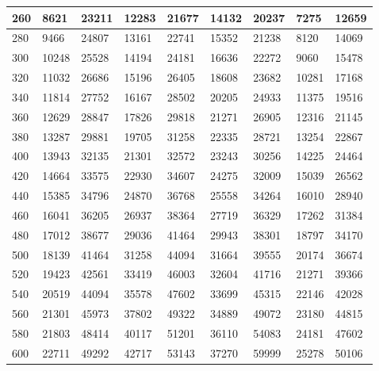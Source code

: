 \documentclass{article}
\begin{document}
\begin{table}[H]
\begin{tabularx}{\textwidth} {| X | X | X | X | X | X | X | X | X |}
    \hline
    260 & 8621 & 23211 & 12283 & 21677 & 14132 & 20237 & 7275 & 12659 \\
    \hline
    280 & 9466 & 24807 & 13161 & 22741 & 15352 & 21238 & 8120 & 14069 \\
    \hline
    300 & 10248 & 25528 & 14194 & 24181 & 16636 & 22272 & 9060 & 15478 \\
    \hline
    320 & 11032 & 26686 & 15196 & 26405 & 18608 & 23682 & 10281 & 17168 \\
    \hline
    340 & 11814 & 27752 & 16167 & 28502 & 20205 & 24933 & 11375 & 19516 \\
    \hline
    360 & 12629 & 28847 & 17826 & 29818 & 21271 & 26905 & 12316 & 21145 \\
    \hline
    380 & 13287 & 29881 & 19705 & 31258 & 22335 & 28721 & 13254 & 22867 \\
    \hline
    400 & 13943 & 32135 & 21301 & 32572 & 23243 & 30256 & 14225 & 24464 \\
    \hline
    420 & 14664 & 33575 & 22930 & 34607 & 24275 & 32009 & 15039 & 26562 \\
    \hline
    440 & 15385 & 34796 & 24870 & 36768 & 25558 & 34264 & 16010 & 28940 \\
    \hline
    460 & 16041 & 36205 & 26937 & 38364 & 27719 & 36329 & 17262 & 31384 \\
    \hline
    480 & 17012 & 38677 & 29036 & 41464 & 29943 & 38301 & 18797 & 34170 \\
    \hline
    500 & 18139 & 41464 & 31258 & 44094 & 31664 & 39555 & 20174 & 36674 \\
    \hline
    520 & 19423 & 42561 & 33419 & 46003 & 32604 & 41716 & 21271 & 39366 \\
    \hline
    540 & 20519 & 44094 & 35578 & 47602 & 33699 & 45315 & 22146 & 42028 \\
    \hline
    560 & 21301 & 45973 & 37802 & 49322 & 34889 & 49072 & 23180 & 44815 \\
    \hline
    580 & 21803 & 48414 & 40117 & 51201 & 36110 & 54083 & 24181 & 47602 \\
    \hline
    600 & 22711 & 49292 & 42717 & 53143 & 37270 & 59999 & 25278 & 50106 \\
    \hline
\end{tabularx}
\end{table}
\end{document}
